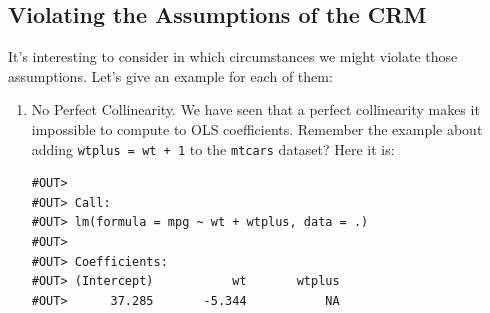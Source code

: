 \documentclass[]{book}
\newenvironment{Shaded}{\begin{snugshade}}{\end{snugshade}}
\newcommand{\DataTypeTok}[1]{\textcolor[rgb]{0.13,0.29,0.53}{#1}}
\newcommand{\DecValTok}[1]{\textcolor[rgb]{0.00,0.00,0.81}{#1}}
\newcommand{\KeywordTok}[1]{\textcolor[rgb]{0.13,0.29,0.53}{\textbf{#1}}}
\newcommand{\NormalTok}[1]{#1}
\newcommand{\OperatorTok}[1]{\textcolor[rgb]{0.81,0.36,0.00}{\textbf{#1}}}
\newcommand{\StringTok}[1]{\textcolor[rgb]{0.31,0.60,0.02}{#1}}
\begin{document}
\hypertarget{violating-the-assumptions-of-the-crm}{%
\subsection{Violating the Assumptions of the CRM}\label{violating-the-assumptions-of-the-crm}}

It's interesting to consider in which circumstances we might violate those assumptions. Let's give an example for each of them:

\begin{enumerate}
\def\labelenumi{\arabic{enumi}.}
\item
  No Perfect Collinearity. We have seen that a perfect collinearity makes it impossible to compute to OLS coefficients. Remember the example about adding \texttt{wtplus\ =\ wt\ +\ 1} to the \texttt{mtcars} dataset? Here it is:

\begin{Shaded}
\end{Shaded}

\begin{verbatim}
#OUT> 
#OUT> Call:
#OUT> lm(formula = mpg ~ wt + wtplus, data = .)
#OUT> 
#OUT> Coefficients:
#OUT> (Intercept)           wt       wtplus  
#OUT>      37.285       -5.344           NA
\end{verbatim}


\end{enumerate}
\end{document}
